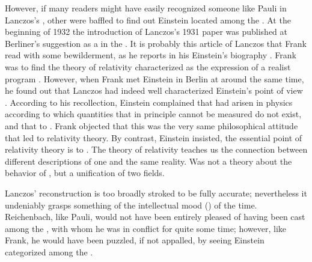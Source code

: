 \documentclass[draft]{article}
\begin{document}



However, if many readers might have easily recognized someone like Pauli in Lanczos's , other were baffled to find out Einstein located among the . At the beginning of 1932 the introduction of Lanczos's 1931 paper was published at Berliner's suggestion as a  in the   \citep[113]{Lanczos1932}. It is probably this article of Lanczos that Frank read with some bewilderment, as he reports in his Einstein's biography \citep{Frank1947}. Frank was  to find the theory of relativity characterized as the expression of a realist program  \citep[215]{Frank1947}. However, when Frank met Einstein in Berlin at around the same time, he found out that Lanczos had indeed well characterized Einstein's point of view \citep[215f.]{Frank1947}. According to his recollection, Einstein complained that  had arisen in physics according to which quantities that in principle cannot be measured do not exist, and that to  \citep[216]{Frank1947}. Frank objected that this was the very same philosophical attitude that led to relativity theory. By contrast, Einstein insisted, the essential point of relativity theory is to   \citep[216]{Frank1947}. The theory of relativity teaches us the connection between different descriptions of one and the same reality. Was not a theory about the behavior of \rac, but a unification of two fields.



%
Lanczos' reconstruction is too broadly stroked to be fully accurate; nevertheless it undeniably grasps something of the intellectual mood () of the time. Reichenbach, like Pauli, would not have been entirely pleased of having been cast among the , with whom he was in conflict for quite some time; however, like Frank, he would have been puzzled, if not appalled, by seeing Einstein categorized among the .
\end{document}
